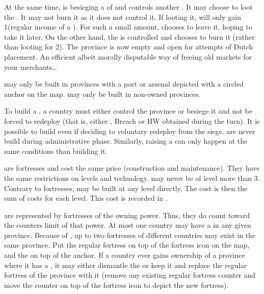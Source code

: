 \begin{exemple}[Burning \TP]
  At the same time, \HOL is besieging a \TP\Facemoins of \paysPortugal and
  controls another \TP\Faceplus. It may choose to loot the \TP\Facemoins. It
  may not burn it as it does not control it. If looting it, \HOL will only
  gain 1\ducats (regular income of a \TP\Facemoins). For such a small amount,
  \HOL chooses to leave it, hoping to take it later. On the other hand, the
  \TP\Faceplus is controlled and \HOL chooses to burn it (rather than looting
  for 2\ducats). The province is now empty and open for attempts of Dutch \TP
  placement. An efficient albeit morally disputable way of freeing old markets
  for your merchants\ldots
\end{exemple}

\label{chRedep:Presidios}
\bparag \Presidios may only be built in provinces with a port or arsenal
depicted with a circled anchor on the map.
\bparag \Presidios may only be built in non-owned provinces.

\bparag To build a \Presidio, a country must either control the province or
besiege it and not be forced to redeploy (that is, either \USURE\Faceplus,
Breach or HW obtained during the turn).
\bparag It is possible to build \Presidio even if deciding to voluntary
redeploy from the siege.
\bparag \Presidios are never build during administrative phase. Similarly,
raising a \Presidio can only happen at the same conditions than building it.

\aparag[Cost]
\bparag \Presidios are fortresses and cost the same price (construction and
maintenance). They have the same restrictions on levels and technology.
\bparag \Presidios may never be of level more than 3.
\bparag Contrary to fortresses, \Presidios may be built at any level
directly. The cost is then the sum of costs for each level.
\bparag This cost is recorded in .

\bparag \Presidios are represented by fortresses of the owning power. Thus,
they do count toward the counters limit of that power.
\bparag At most one country may have a \Presidio in any given province.
\bparag Because of \Presidios, up to two fortresses of different countries may
exist in the same province. Put the regular fortress on top of the fortress
icon on the map, and the \Presidio on top of the anchor.
\bparag If a country ever gains ownership of a province where it has a
\Presidio, it may either dismantle the \Presidio or keep it and replace the
regular fortress of the province with it (remove any existing regular fortress
counter and move the \Presidio counter on top of the fortress icon to depict
the new fortress).

